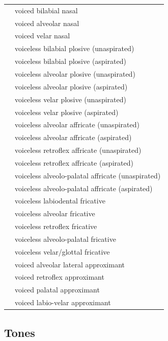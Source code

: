 \documentclass{article}
\begin{document}
\begin{xltabular}{\textwidth}{lL}
   & voiced bilabial nasal \\
   & voiced alveolar nasal \\
   & voiced velar nasal \\
   & voiceless bilabial plosive (unaspirated) \\
   & voiceless bilabial plosive (aspirated) \\
   & voiceless alveolar plosive (unaspirated) \\
   & voiceless alveolar plosive (aspirated) \\
   & voiceless velar plosive (unaspirated) \\
   & voiceless velar plosive (aspirated) \\
   & voiceless alveolar affricate (unaspirated) \\
   & voiceless alveolar affricate (aspirated) \\
   & voiceless retroflex affricate (unaspirated) \\
   & voiceless retroflex affricate (aspirated) \\
   & voiceless alveolo-palatal affricate (unaspirated) \\
   & voiceless alveolo-palatal affricate (aspirated) \\
   & voiceless labiodental fricative \\
   & voiceless alveolar fricative \\
   & voiceless retroflex fricative \\
  \ipa{\textctc} & voiceless alveolo-palatal fricative \\
   & voiceless velar/glottal fricative \\
   & voiced alveolar lateral approximant \\
   & voiced retroflex approximant \\
   & voiced palatal approximant \\
   & voiced labio-velar approximant \\
\end{xltabular}

\subsection{Tones}
\end{document}
